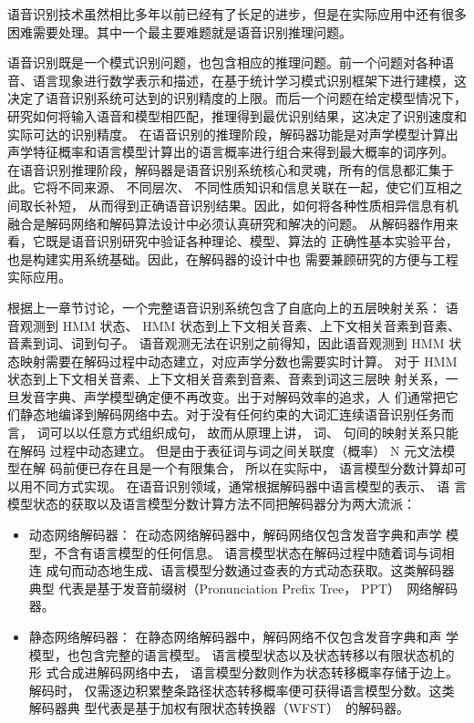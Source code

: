 语音识别技术虽然相比多年以前已经有了长足的进步，但是在实际应用中还有很多
困难需要处理。其中一个最主要难题就是语音识别推理问题。

语音识别既是一个模式识别问题，也包含相应的推理问题。前一个问题对各种语音、语言现象进行数学表示和描述，在基于统计学习模式识别框架下进行建模，这决定了语音识别系统可达到的识别精度的上限。而后一个问题在给定模型情况下，研究如何将输入语音和模型相匹配，推理得到最优识别结果，这决定了识别速度和实际可达的识别精度。
%
在语音识别的推理阶段，解码器功能是对声学模型计算出声学特征概率和语言模型计算出的语言概率进行组合来得到最大概率的词序列。
%
在语音识别推理阶段，解码器是语音识别系统核心和灵魂，所有的信息都汇集于此。它将不同来源、 不同层次、 不同性质知识和信息关联在一起，使它们互相之间取长补短， 从而得到正确语音识别结果。因此，如何将各种性质相异信息有机融合是解码网络和解码算法设计中必须认真研究和解决的问题。
从解码器作用来看，它既是语音识别研究中验证各种理论、模型、算法的
正确性基本实验平台，也是构建实用系统基础。因此，在解码器的设计中也
需要兼顾研究的方便与工程实际应用。

根据上一章节讨论，一个完整语音识别系统包含了自底向上的五层映射关系：
语音观测到 HMM 状态、 HMM 状态到上下文相关音素、上下文相关音素到音素、
音素到词、词到句子。 语音观测无法在识别之前得知，因此语音观测到 HMM 状
态映射需要在解码过程中动态建立，对应声学分数也需要实时计算。
对于 HMM 状态到上下文相关音素、上下文相关音素到音素、音素到词这三层映
射关系，一旦发音字典、声学模型确定便不再改变。出于对解码效率的追求，人
们通常把它们静态地编译到解码网络中去。对于没有任何约束的大词汇连续语音识别任务而言，
词可以以任意方式组织成句， 故而从原理上讲， 词、 句间的映射关系只能在解码
过程中动态建立。 但是由于表征词与词之间关联度（概率） N 元文法模型在解
码前便已存在且是一个有限集合， 所以在实际中， 语言模型分数计算却可
以用不同方式实现。 在语音识别领域，通常根据解码器中语言模型的表示、 语
言模型状态的获取以及语言模型分数计算方法不同把解码器分为两大流派：
\begin{itemize}
\item 动态网络解码器： 在动态网络解码器中，解码网络仅包含发音字典和声学
模型，不含有语言模型的任何信息。 语言模型状态在解码过程中随着词与词相连
成句而动态地生成、语言模型分数通过查表的方式动态获取。这类解码器典型
代表是基于发音前缀树（Pronunciation Prefix Tree， PPT）~\cite{woodland1994large}网络解码器。
\item 静态网络解码器： 在静态网络解码器中，解码网络不仅包含发音字典和声
学模型，也包含完整的语言模型。 语言模型状态以及状态转移以有限状态机的形
式合成进解码网络中去， 语言模型分数则作为状态转移概率存储于边上。解码时，
仅需逐边积累整条路径状态转移概率便可获得语言模型分数。这类解码器典
型代表是基于加权有限状态转换器（WFST）~\cite{mohri2002weighted}的解码器。
\end{itemize}

